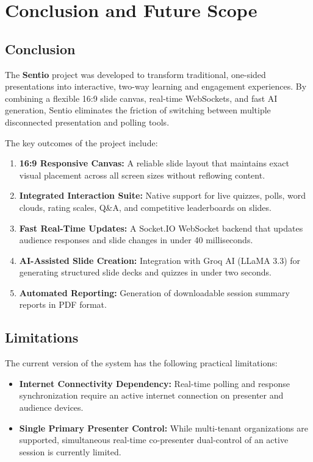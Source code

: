 \chapter{Conclusion and Future Scope}

\section{Conclusion}

The \textbf{Sentio} project was developed to transform traditional, one-sided presentations into interactive, two-way learning and engagement experiences. By combining a flexible 16:9 slide canvas, real-time WebSockets, and fast AI generation, Sentio eliminates the friction of switching between multiple disconnected presentation and polling tools.

The key outcomes of the project include:
\begin{enumerate}
    \item \textbf{16:9 Responsive Canvas:} A reliable slide layout that maintains exact visual placement across all screen sizes without reflowing content.
    \item \textbf{Integrated Interaction Suite:} Native support for live quizzes, polls, word clouds, rating scales, Q\&A, and competitive leaderboards on slides.
    \item \textbf{Fast Real-Time Updates:} A Socket.IO WebSocket backend that updates audience responses and slide changes in under 40 milliseconds.
    \item \textbf{AI-Assisted Slide Creation:} Integration with Groq AI (LLaMA 3.3) for generating structured slide decks and quizzes in under two seconds.
    \item \textbf{Automated Reporting:} Generation of downloadable session summary reports in PDF format.
\end{enumerate}

\section{Limitations}

The current version of the system has the following practical limitations:
\begin{itemize}
    \item \textbf{Internet Connectivity Dependency:} Real-time polling and response synchronization require an active internet connection on presenter and audience devices.
    \item \textbf{Single Primary Presenter Control:} While multi-tenant organizations are supported, simultaneous real-time co-presenter dual-control of an active session is currently limited.
\end{itemize}

